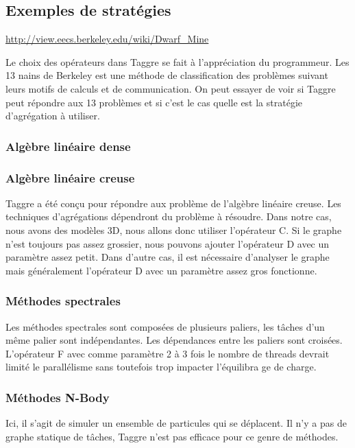 \subsection{Exemples de stratégies}
\url{http://view.eecs.berkeley.edu/wiki/Dwarf_Mine}

Le choix des opérateurs dans Taggre se fait à l'appréciation du programmeur.
%
Les 13 nains de Berkeley est une méthode de classification des problèmes suivant leurs motifs de calculs et de communication.
%
On peut essayer de voir si Taggre peut répondre aux 13 problèmes et si c'est le cas quelle est la stratégie d'agrégation à utiliser.

\subsubsection{Algèbre linéaire dense}


\subsubsection{Algèbre linéaire creuse}
Taggre a été conçu pour répondre aux problème de l'algèbre linéaire creuse.
%
Les techniques d'agrégations dépendront du problème à résoudre.
%
Dans notre cas, nous avons des modèles 3D, nous allons donc utiliser l'opérateur C.
%
Si le graphe n'est toujours pas assez grossier, nous pouvons ajouter l'opérateur D avec un paramètre assez petit.
%
Dans d'autre cas, il est nécessaire d'analyser le graphe mais généralement l'opérateur D avec un paramètre assez gros fonctionne.



\subsubsection{Méthodes spectrales}
Les méthodes spectrales sont composées de plusieurs paliers, les tâches d'un même palier sont indépendantes.
%
Les dépendances entre les paliers sont croisées.
%
L'opérateur F avec comme paramètre 2 à 3 fois le nombre de threads devrait limité le parallélisme sans toutefois trop impacter l'équilibra
ge de charge.



\subsubsection{Méthodes N-Body}
Ici, il s'agit de simuler un ensemble de particules qui se déplacent.
%
Il n'y a pas de graphe statique de tâches, Taggre n'est pas efficace pour ce genre de méthodes.



